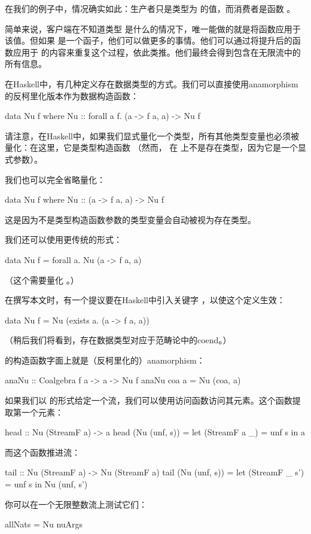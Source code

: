 \documentclass[DaoFP]{subfiles}
\begin{document}
在我们的例子中，情况确实如此：生产者只是类型为  的值，而消费者是函数 。

简单来说，客户端在不知道类型  是什么的情况下，唯一能做的就是将函数应用于该值。但如果  是一个函子，他们可以做更多的事情。他们可以通过将提升后的函数应用于  的内容来重复这个过程，依此类推。他们最终会得到包含在无限流中的所有信息。

在Haskell中，有几种定义存在数据类型的方式。我们可以直接使用anamorphism的反柯里化版本作为数据构造函数：
\begin{haskell}
data Nu f where 
  Nu :: forall a f. (a -> f a, a) -> Nu f
\end{haskell}
请注意，在Haskell中，如果我们显式量化一个类型，所有其他类型变量也必须被量化：在这里，它是类型构造函数 （然而， 在  上不是存在类型，因为它是一个显式参数）。

我们也可以完全省略量化：
\begin{haskell}
data Nu f where 
  Nu :: (a -> f a, a) -> Nu f
\end{haskell}
这是因为不是类型构造函数参数的类型变量会自动被视为存在类型。

我们还可以使用更传统的形式：
\begin{haskell}
data Nu f = forall a. Nu (a -> f a, a)
\end{haskell}
（这个需要量化 。）

在撰写本文时，有一个提议要在Haskell中引入关键字 ，以使这个定义生效：
\begin{haskell}
data Nu f = Nu (exists a. (a -> f a, a))
\end{haskell}
（稍后我们将看到，存在数据类型对应于范畴论中的coend。）

 的构造函数字面上就是（反柯里化的）anamorphism：
\begin{haskell}
anaNu :: Coalgebra f a -> a -> Nu f
anaNu coa a = Nu (coa, a)
\end{haskell}

如果我们以  的形式给定一个流，我们可以使用访问函数访问其元素。这个函数提取第一个元素：
\begin{haskell}
head :: Nu (StreamF a) -> a
head (Nu (unf, s)) = 
  let (StreamF a _) = unf s 
  in a
\end{haskell}
而这个函数推进流：
\begin{haskell}
tail :: Nu (StreamF a) -> Nu (StreamF a)
tail (Nu (unf, s)) = 
  let (StreamF _ s') = unf s 
  in Nu (unf, s')
\end{haskell}
你可以在一个无限整数流上测试它们：
\begin{haskell}
allNats = Nu nuArgs
\end{haskell}
\end{document}
